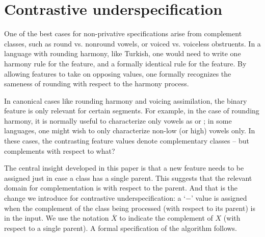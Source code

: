 \documentclass[11pt, oneside]{article}   	%
\begin{document}
\section{Contrastive underspecification}

One of the best cases for non-privative specifications arise from complement classes, such as round vs. nonround vowels, or voiced vs. voiceless obstruents. In a language with rounding harmony, like Turkish, one would need to write one harmony rule for the  feature, and a formally identical rule for the  feature. By allowing features to take on opposing values, one formally recognizes the sameness of rounding with respect to the harmony process.

In canonical cases like rounding harmony and voicing assimilation, the binary feature is only relevant for certain segments. For example, in the case of rounding harmony, it is normally useful to characterize only vowels as  or ; in some languages, one might wish to only characterize non-low (or high) vowels only. In these cases, the contrasting feature values denote complementary classes -- but complements with respect to what?

The central insight developed in this paper is that a new feature needs to be assigned just in case a class has a single parent. This suggests that the relevant domain for complementation is with respect to the parent. And that is the change we introduce for contrastive underspecification: a `$-$' value is assigned when the complement of the class being processed (with respect to its parent) is in the input. We use the notation $\overline{X}$ to indicate the complement of $X$ (with respect to a single parent). A formal specification of the algorithm follows.
\end{document}

